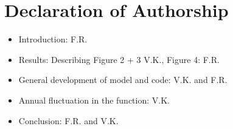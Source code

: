 \documentclass[10pt, a4paper]{article}
\begin{document}
\section{Declaration of Authorship}
\begin{itemize}
	\item Introduction: F.R.
	\item Results: Describing Figure 2 + 3 V.K., Figure 4: F.R.
	\item General development of model and code: V.K. and F.R.
	\item Annual fluctuation in the function: V.K.
	\item Conclusion: F.R. and V.K.
\end{itemize}
\end{document}
